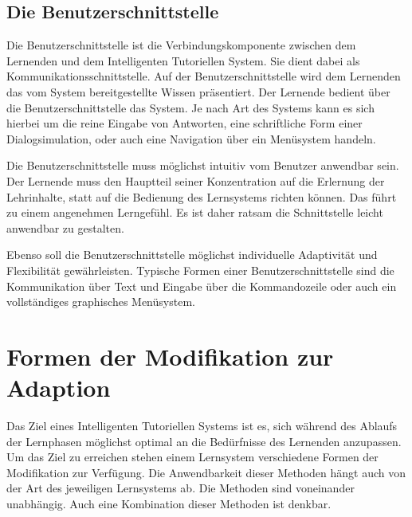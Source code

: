 \subsection{Die Benutzerschnittstelle}
Die Benutzerschnittstelle ist die Verbindungskomponente zwischen dem Lernenden und dem Intelligenten Tutoriellen System.
Sie dient dabei als Kommunikationsschnittstelle. Auf der Benutzerschnittstelle wird dem Lernenden das vom System bereitgestellte Wissen
präsentiert. Der Lernende bedient über die Benutzerschnittstelle das System. Je nach Art des Systems kann es sich hierbei um die reine
Eingabe von Antworten, eine schriftliche Form einer Dialogsimulation, oder auch eine Navigation über ein Menüsystem handeln.

Die Benutzerschnittstelle muss möglichst intuitiv vom Benutzer anwendbar sein. Der Lernende muss den Hauptteil
seiner Konzentration auf die Erlernung der Lehrinhalte, statt auf die Bedienung des Lernsystems richten können. Das führt zu einem
angenehmen Lerngefühl. Es ist daher ratsam die Schnittstelle leicht anwendbar zu gestalten.

Ebenso soll die Benutzerschnittstelle möglichst individuelle Adaptivität und Flexibilität gewährleisten.
Typische Formen einer Benutzerschnittstelle sind die Kommunikation über Text und Eingabe über die Kommandozeile oder auch ein
vollständiges graphisches Menüsystem.

\section{Formen der Modifikation zur Adaption}
Das Ziel eines Intelligenten Tutoriellen Systems ist es, sich während des Ablaufs der
Lernphasen möglichst optimal an die Bedürfnisse des Lernenden anzupassen. Um das Ziel zu erreichen
stehen einem Lernsystem verschiedene Formen der Modifikation zur Verfügung. Die Anwendbarkeit dieser
Methoden hängt auch von der Art des jeweiligen Lernsystems ab. Die Methoden sind voneinander unabhängig.
Auch eine Kombination dieser Methoden ist denkbar.


